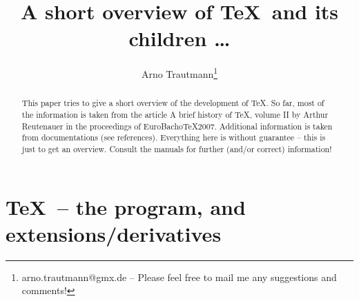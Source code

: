 \documentclass{scrartcl}
\title{A short overview of \TeX\ and its children \dots}
\author{Arno Trautmann\thanks{arno.trautmann@gmx.de -- Please feel free to mail me any suggestions and comments!}}
\date{}
\begin{document}
\maketitle


\begin{abstract}
This paper tries to give a short overview of the development of \TeX. So far, most of the information is taken from the article \textsf{A brief history of \TeX, volume II} by Arthur Reutenauer in the proceedings of \textsf{EuroBacho\TeX 2007}. Additional information is taken from documentations (see references). Everything here is without guarantee -- this is just to get an overview. Consult the manuals for further (and/or correct) information!
\end{abstract}

\newpage
\section*{\TeX\ -- the program, and extensions/derivatives}
\Large
\centering
\end{document}
